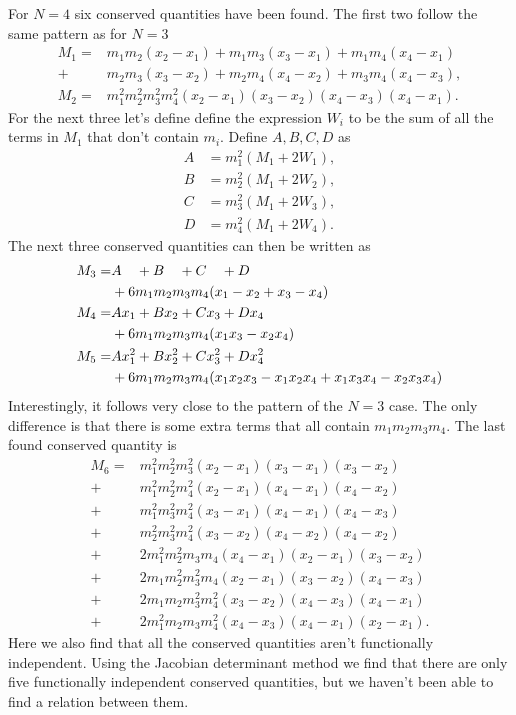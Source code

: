\documentclass[english,master]{liumaiex}
\theoremstyle{plain}
\theoremstyle{definition}
\begin{document}
For $N = 4$ six conserved quantities have been found. The first two follow the same pattern as for $N = 3$
\begin{align}
	M_1 = &m_1 m_2 (x_2 - x_1) + m_1 m_3 (x_3 - x_1) + m_1 m_4 (x_4 - x_1) \\ +  &m_2 m_3 (x_3 - x_2) + m_2 m_4 (x_4 - x_2) + m_3 m_4 (x_4 - x_3),\\
	M_2 = &m_1^2m_2^2m_3^2m_4^2(x_2 - x_1)(x_3 - x_2)(x_4 - x_3)(x_4 - x_1).
\end{align}
For the next three let's define define the expression $W_i$ to be the sum of all the terms in $M_1$ that don't contain $m_i$. Define $A, B, C, D$ as
\begin{align}
	A &= m_1^2(M_1 + 2W_1), \\
	B &= m_2^2(M_1 + 2W_2), \\
	C &= m_3^2(M_1 + 2W_3), \\
	D &= m_4^2(M_1 + 2W_4).
\end{align}
The next  three conserved quantities can then be written as
\begin{align}
	M_3 =& A\phantom{x_1} + B\phantom{x_2} + C\phantom{x_3} + D\phantom{x_4} \notag \\
	&+ 6m_1m_2m_3m_4 (x_1 - x_2 + x_3 - x_4) \\
	M_4 =& Ax_1 + Bx_2 + Cx_3 + Dx_4 \notag \\
	&+ 6m_1m_2m_3m_4 (x_1x_3 - x_2x_4) \\
	M_5 =& Ax_1^2 + Bx_2^2 + Cx_3^2 + Dx_4^2 \notag \\
	&+ 6m_1m_2m_3m_4 (x_1x_2x_3 - x_1x_2x_4 + x_1x_3x_4 - x_2x_3x_4)
\end{align}
%
Interestingly, it follows very close to the pattern of the $N = 3$ case. The only difference is that there is some extra terms that all contain $m_1m_2m_3m_4$. The last found conserved quantity is
\begin{equation}
\begin{aligned}
	M_6 =
		 &m_1^2m_2^2m_3^2(x_2 - x_1)(x_3 - x_1)(x_3 - x_2) \\
		+&m_1^2m_2^2m_4^2(x_2 - x_1)(x_4 - x_1)(x_4 - x_2) \\
		+&m_1^2m_3^2m_4^2(x_3 - x_1)(x_4 - x_1)(x_4 - x_3) \\
		+&m_2^2m_3^2m_4^2(x_3 - x_2)(x_4 - x_2)(x_4 - x_2) \\
		+&2m_1^2m_2^2m_3m_4(x_4 - x_1)(x_2 - x_1)(x_3 - x_2) \\
		+&2m_1m_2^2m_3^2m_4(x_2 - x_1)(x_3 - x_2)(x_4 - x_3) \\
		+&2m_1m_2m_3^2m_4^2(x_3 - x_2)(x_4 - x_3)(x_4 - x_1) \\
		+&2m_1^2m_2m_3m_4^2(x_4 - x_3)(x_4 - x_1)(x_2 - x_1).
\end{aligned}
\end{equation}
Here we also find that all the conserved quantities aren't functionally independent. Using the Jacobian determinant method we find that there are only five functionally independent conserved quantities, but we haven't been able to find a relation between them.
\end{document}
